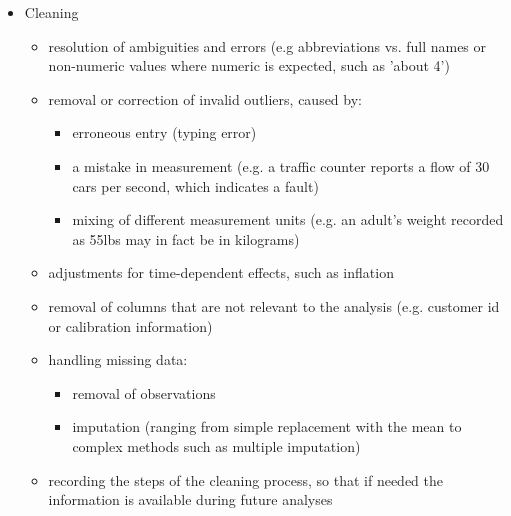 \begin{itemize}
\item Cleaning

\begin{itemize}
\item resolution of ambiguities and errors (e.g abbreviations vs. full names or non-numeric values where numeric is expected, such as 'about 4')
\item removal or correction of invalid outliers, caused by:

\begin{itemize}
\item erroneous entry (typing error)
\item a mistake in measurement (e.g. a traffic counter reports a flow of 30 cars per second, which indicates a fault)
\item mixing of different measurement units (e.g. an adult's weight recorded as 55lbs may in fact be in kilograms)
\end{itemize} 

\item adjustments for time-dependent effects, such as inflation
\item removal of columns that are not relevant to the analysis (e.g. customer id or calibration information)
\item handling missing data:
  \begin{itemize}
  \item removal of observations
  \item imputation (ranging from simple replacement with the mean to complex methods such as multiple imputation)
    \end{itemize}
\item recording the steps of the cleaning process, so that if needed the information is available during future analyses
\end{itemize}
\end{itemize}
\newpage




